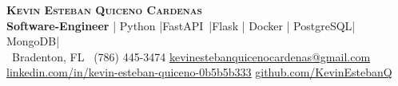 \begin{center}
    \textbf{\Huge \scshape Kevin Esteban Quiceno Cardenas} \\ \vspace{2pt}
    \small \textbf{Software-Engineer} \;|\; Python \;|\;FastAPI\ \;|\;Flask \;|\; Docker \;|\; PostgreSQL\;|\; MongoDB\;|\;\\ \vspace{2pt}
     \ \small Bradenton, FL \quad
     \ \small (786) 445-3474 \quad
    \href{mailto:kevinestebanquicenocardenas@gmail.com}{ \underline{kevinestebanquicenocardenas@gmail.com}} \quad
    \href{https://www.linkedin.com/in/kevin-esteban-quiceno-0b5b5b333}{ \underline{linkedin.com/in/kevin-esteban-quiceno-0b5b5b333}} \quad
    \href{https://github.com/KevinEstebanQ}{ \underline{github.com/KevinEstebanQ}}
\end{center}
